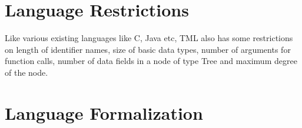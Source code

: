 \documentclass[12pt,psfig,a4]{article}
\begin{document}
\section{Language Restrictions}
Like various existing languages like C, Java etc, TML also has some restrictions on length of identifier names, size of basic data types, number of arguments for function calls, number of data fields in a node of type Tree and maximum degree of the node.

\section{Language Formalization}







\end{document}
